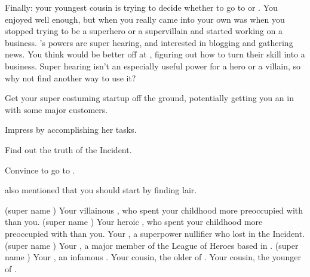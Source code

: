 \documentclass[char]{LRSguildcamp1}
\begin{document}
Finally: your youngest cousin \cTween{} is trying to decide whether to go to \pSuperSchool{} or \pNormalSchool{}.  You enjoyed \pSuperSchool{} well enough, but when you really came into your own was when you stopped trying to be a superhero or a supervillain and started working on a business.  \cTween{}'s powers are super hearing, and \cTween{\theyare} interested in blogging and gathering news.  You think \cTween{\they} would be better off at \pNormalSchool{}, figuring out how to turn their skill into a business.  Super hearing isn't an especially useful power for a hero or a villain, so why not find another way to use it?

\begin{itemz}[Goals]
	\item Get your super costuming startup off the ground, potentially getting you an in with some major customers.
	\item Impress \cGrandma{} by accomplishing her tasks.
	\item Find out the truth of the \pCityO{} Incident.
	\item Convince \cTween{} to go to \pNormalSchool{}.

\end{itemz}

\begin{itemz}[Notes]
	\item \cGrandma{} also mentioned that you should start by finding \cGrandma{\their} lair.   
\end{itemz}

\begin{contacts}
	\contact{\cOldest{\intro}} (super name \cOldest{\MYsupername}) Your villainous \cOldest{\parent}, who spent your childhood more preoccupied with \cOS{} than you.
	\contact{\cOS{\intro}} (super name \cOS{\MYsupername}) Your heroic \cOS{\parent}, who spent your childhood more preoccupied with \cOldest{} than you.
	\contact{\cArchitect{\intro}} Your \cArchitect{\uncle}, a superpower nullifier who lost \cArchitect{\their} \cAS{\spouse} in the \pCityO{} Incident.
	\contact{\cYoungest{\intro}}  (super name \cYoungest{\MYsupername}) Your \cYoungest{\uncle}, a major member of the League of Heroes based in \pCityYoungest{}.
	\contact{\cGrandma{\intro}}  (super name \cGrandma{\MYsupername}) Your \cGrandma{\grandparent}, an infamous \cGrandma{\villain}.
	\contact{\cTeen{\intro}} Your cousin, the older \cTeen{\offspring} of \cArchitect{\Uncle} \cArchitect{}.
	\contact{\cTween{\intro}} Your cousin, the younger \cTween{\offspring} of \cArchitect{\Uncle} \cArchitect{}.
\end{contacts}
\end{document}
